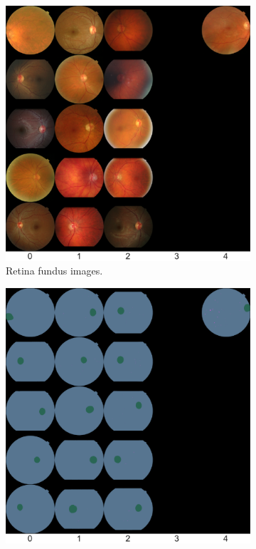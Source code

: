 \begin{figure}[h]
    \centering
    \begin{subfigure}{0.45\textwidth}
        \centering
        \includegraphics[width=\textwidth]{datasets/figs/eophtha_real_sample.pdf}
        \caption{Retina fundus images.}
        \label{fig:eophtha_sample_real}
    \end{subfigure} %
    \begin{subfigure}{0.45\textwidth}
        \centering
        \includegraphics[width=\textwidth]{datasets/figs/eophtha_label_sample.pdf}

\end{subfigure}
\end{figure}
